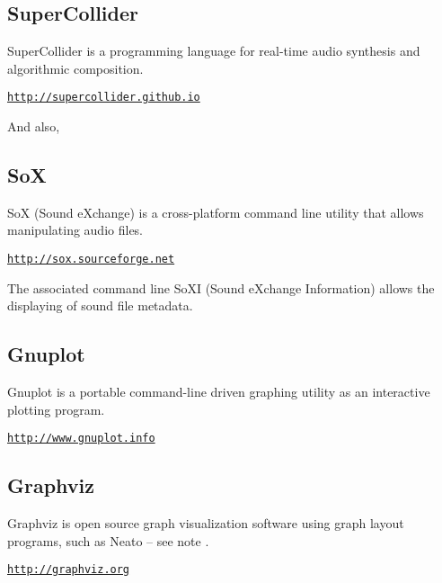 \subsection*{SuperCollider}

SuperCollider is a programming language for real-time audio synthesis and algorithmic composition.

\href{http://supercollider.github.io}{\texttt{\small http://supercollider.github.io}}

\bigskip

\noindent And also,

\subsection*{SoX}

SoX (Sound eXchange) is a cross-platform command line utility that allows manipulating audio files.

\href{http://sox.sourceforge.net}{\texttt{\small http://sox.sourceforge.net}}

\bigskip

The associated command line SoXI (Sound eXchange Information) allows the displaying of sound file metadata.

\subsection*{Gnuplot}

Gnuplot is a portable command-line driven graphing utility as an interactive plotting program.

\href{http://www.gnuplot.info}{\texttt{\small http://www.gnuplot.info}}

\subsection*{Graphviz}

Graphviz is open source graph visualization software using graph layout programs, such as Neato -- see note .

\href{http://graphviz.org}{\small{\texttt{http://graphviz.org}}}